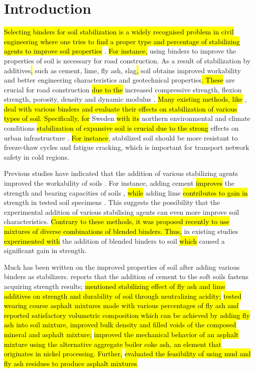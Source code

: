 \documentclass[constrmater,article,submit,pdftex,moreauthors]{Definitions/mdpi}
\begin{document}
\section{Introduction}

\hl{Selecting binders for soil stabilization is a widely recognised problem in civil engineering where one tries to find a proper type and percentage of stabilizing agents to improve soil properties} \cite{Consoli2019,daRocha,Freitag}. \hl{For instance, }using binders to improve the properties of soil is necessary for road construction. As a result of stabilization by additives\hl{, }such as cement, lime, fly ash, slag\hl{, }soil obtains improved workability and better engineering characteristics and geotechnical properties\hl{. These }are crucial for road construction \hl{due to the} increased compressive strength, flexion strength, porosity, density and dynamic modulus \cite{Carasca}. \hl{Many existing methods, like} \cite{Mypati,Sargent}, \hl{deal with various binders and evaluate their effects on stabilization of various types of soil. Specifically, for} Sweden \hl{with its }northern environmental and climate conditions \hl{stabilization of expansive soil is crucial due to the strong} effects on urban infrastructure \citep{Amorim,Gustavsson}. \hl{For instance}, stabilized soil should be more resistant to freeze-thaw cycles and fatigue cracking, which is important for transport network safety in cold regions. 

Previous studies have indicated that the addition of various stabilizing agents improved the workability of soils \citep{Etim,Fasihnikoutalab,Kogbara,Lindh2022b,Mavroulidou}. For instance, adding cement \hl{improves} the strength and bearing capacities of soils \cite{Ekpo}, \hl{while} adding lime \hl{contributes to gain in} strength in tested soil specimens \cite{Frempong}. This suggests the possibility that the experimental addition of various stabilising agents can even more improve soil characteristics. \hl{Contrary to these methods, it was proposed recently to use mixtures of diverse combinations of blended binders. Thus, }in existing studies \citep{Abbey,AlHdabi,ma15217798,Jafer,Lietal2021,Wangetal2015} \hl{experimented with} the addition of\hl{ }blended binders to soil \hl{which }caused a significant gain in strength.

Much has been written on the improved properties of soil after adding various binders as stabilizers. \cite{Consoli} reports that the addition of cement to the soft soils fastens acquiring strength results; \cite{MESKINI2021129161} \hl{mentioned stabilizing effect of fly ash and lime additives on strength and durability of soil through neutralizing acidity;} \cite{Mirkovic} \hl{tested wearing course asphalt mixtures made with various percentages of fly ash and reported satisfactory volumetric composition which can be achieved by adding fly ash into soil mixture, improved bulk density and filled voids of the composed mineral and asphalt mixture;} \cite{app12189134} \hl{improved the mechanical behavior of an asphalt mixture using the alternative aggregate boiler coke ash, an element that originates in nickel processing. Further,} \cite{Lima} \hl{evaluated the feasibility of using  mud and fly ash residues to produce asphalt mixtures}. 
\end{document}
